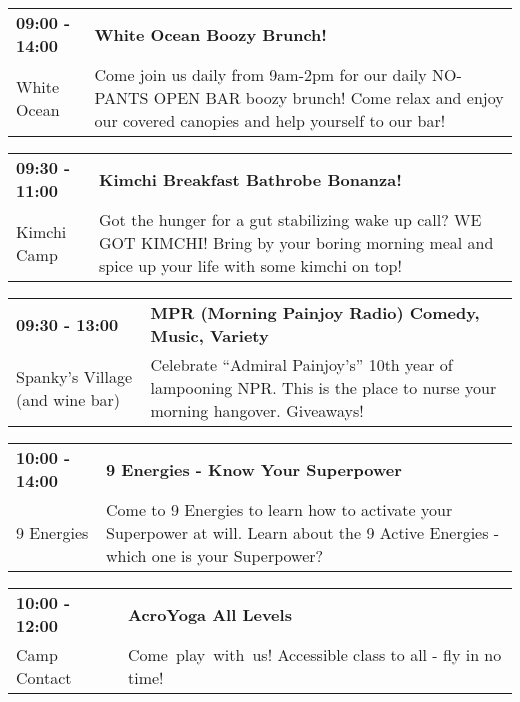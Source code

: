 \begin{tabular}{ p{1in} p{2.2in} }
    \textbf{09:00 - 14:00} & \textbf{White Ocean Boozy Brunch!} \\
    White Ocean \newline  & Come join us daily from 9am-2pm for our daily NO-PANTS OPEN BAR boozy brunch! Come relax and enjoy our covered canopies and help yourself to our bar! \\
    \hline 
\end{tabular}
    
\begin{tabular}{ p{1in} p{2.2in} }
    \textbf{09:30 - 11:00} & \textbf{Kimchi Breakfast Bathrobe Bonanza!} \\
    Kimchi Camp \newline  & Got the hunger for a gut stabilizing wake up call? WE GOT KIMCHI! Bring by your boring morning meal and spice up your life with some kimchi on top! \\
    \hline 
\end{tabular}
    
\begin{tabular}{ p{1in} p{2.2in} }
    \textbf{09:30 - 13:00} & \textbf{MPR (Morning Painjoy Radio) Comedy, Music, Variety} \\
    Spanky's Village (and wine bar) \newline  & Celebrate ``Admiral Painjoy's'' 10th year of lampooning NPR.  This is the place to nurse your morning hangover.  Giveaways! \\
    \hline 
\end{tabular}
    
\begin{tabular}{ p{1in} p{2.2in} }
    \textbf{10:00 - 14:00} & \textbf{9 Energies - Know Your Superpower} \\
    9 Energies \newline  & Come to 9 Energies to learn how to activate your Superpower at will. Learn about the 9 Active Energies - which one is your Superpower? \\
    \hline 
\end{tabular}
    
\begin{tabular}{ p{1in} p{2.2in} }
    \textbf{10:00 - 12:00} & \textbf{AcroYoga All Levels} \\
    Camp Contact \newline  & Come~play~with~us! Accessible class to all - fly in no time! \\
    \hline 
\end{tabular}
    
